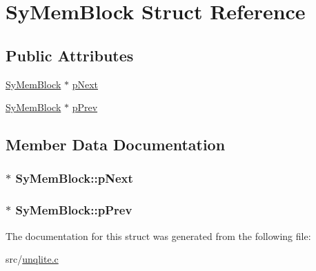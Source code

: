 \hypertarget{struct_sy_mem_block}{\section{Sy\-Mem\-Block Struct Reference}
\label{dd/d9f/struct_sy_mem_block}
}
\subsection*{Public Attributes}
\begin{DoxyCompactItemize}
\item 
\hyperlink{struct_sy_mem_block}{Sy\-Mem\-Block} $\ast$ \hyperlink{struct_sy_mem_block_a60eb6e4b9f82905387ce8f867e268d1c}{p\-Next}
\item 
\hyperlink{struct_sy_mem_block}{Sy\-Mem\-Block} $\ast$ \hyperlink{struct_sy_mem_block_a7d25ae19a7276c1f54c2902ce625e122}{p\-Prev}
\end{DoxyCompactItemize}


\subsection{Member Data Documentation}
\hypertarget{struct_sy_mem_block_a60eb6e4b9f82905387ce8f867e268d1c}{
\subsubsection[{p\-Next}]{$\ast$ Sy\-Mem\-Block\-::p\-Next}}\label{dd/d9f/struct_sy_mem_block_a60eb6e4b9f82905387ce8f867e268d1c}
\hypertarget{struct_sy_mem_block_a7d25ae19a7276c1f54c2902ce625e122}{
\subsubsection[{p\-Prev}]{ $\ast$ Sy\-Mem\-Block\-::p\-Prev}}\label{dd/d9f/struct_sy_mem_block_a7d25ae19a7276c1f54c2902ce625e122}


The documentation for this struct was generated from the following file\-:\begin{DoxyCompactItemize}
\item 
src/\hyperlink{unqlite_8c}{unqlite.\-c}\end{DoxyCompactItemize}
